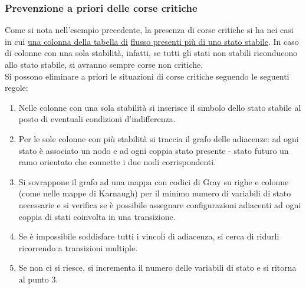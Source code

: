 \documentclass{article}
\begin{document}
\subsubsection{Prevenzione a priori delle corse critiche}
Come si nota nell’esempio precedente, la presenza di corse critiche si ha nei casi in cui \underline{una colonna della tabella di} \underline{flusso presenti più di uno stato stabile}. In caso di colonne con una sola stabilità, infatti, se tutti gli stati non stabili riconducono allo stato stabile, si avranno sempre corse non critiche.
\vspace{0.2cm}\\
Si possono eliminare a priori le situazioni di corse critiche seguendo le seguenti regole:
\begin{enumerate}
    \item Nelle colonne con una sola stabilità si inserisce il simbolo dello stato stabile al posto di eventuali condizioni d’indifferenza.
    \item Per le sole colonne con più stabilità si traccia il grafo delle adiacenze: ad ogni stato è associato un nodo e ad ogni coppia stato presente - stato futuro un ramo orientato che connette i due nodi corrispondenti.
    \item Si sovrappone il grafo ad una mappa con codici di Gray su righe e colonne (come nelle mappe di Karnaugh) per il minimo numero di variabili di stato necessarie e si verifica se è possibile assegnare configurazioni adiacenti ad ogni coppia di stati coinvolta in una transizione.
    \item Se è impossibile soddisfare tutti i vincoli di adiacenza, si cerca di ridurli ricorrendo a transizioni multiple.
    \item Se non ci si riesce, si incrementa il numero delle variabili di stato e si ritorna al punto 3.
\end{enumerate}
\end{document}
